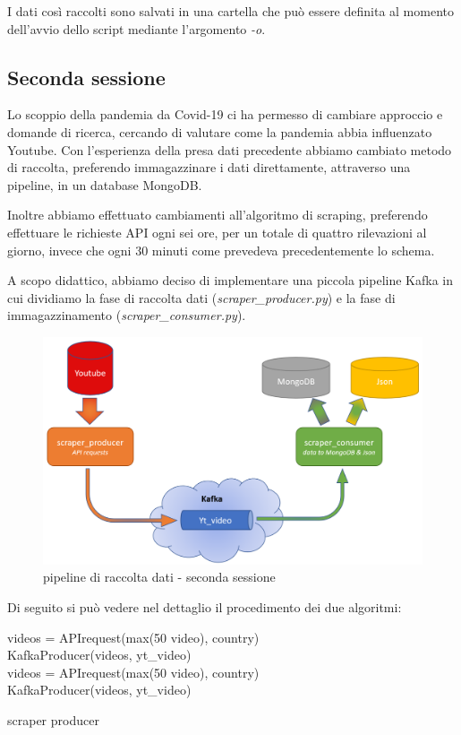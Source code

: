 I dati così raccolti sono salvati in una cartella che può essere definita al momento dell'avvio dello script mediante l'argomento \textit{-o}.

\subsection*{Seconda sessione}

Lo scoppio della pandemia da Covid-19 ci ha permesso di cambiare approccio e domande di ricerca, cercando di valutare come la pandemia abbia influenzato Youtube. Con l'esperienza della presa dati precedente abbiamo cambiato metodo di raccolta, preferendo immagazzinare i dati direttamente, attraverso una pipeline, in un database MongoDB.

Inoltre abbiamo effettuato cambiamenti all'algoritmo di scraping, preferendo effettuare le richieste API ogni sei ore, per un totale di quattro rilevazioni al giorno, invece che ogni 30 minuti come prevedeva precedentemente lo schema.

A scopo didattico, abbiamo deciso di implementare una piccola pipeline Kafka in cui dividiamo la fase di raccolta dati (\textit{scraper\_producer.py}) e la fase di immagazzinamento (\textit{scraper\_consumer.py}). 

\begin{figure}[H]
	\centering
	\includegraphics[width=0.8\linewidth]{pics/pipeline.png}
	\caption{pipeline di raccolta dati - seconda sessione}
\end{figure}

Di seguito si può vedere nel dettaglio il procedimento dei due algoritmi:

\begin{algorithm}[H]
	\nl {} {
		\nl {}
		{
			\nl videos = APIrequest(max(50 video), country)\\
			\nl KafkaProducer(videos, yt\_video) \\ 
			\nl {}
			{
				\nl videos = APIrequest(max(50 video), country) \\
				\nl KafkaProducer(videos, yt\_video) \\
			}
		}
	}
	\caption{scraper producer}
\end{algorithm}

